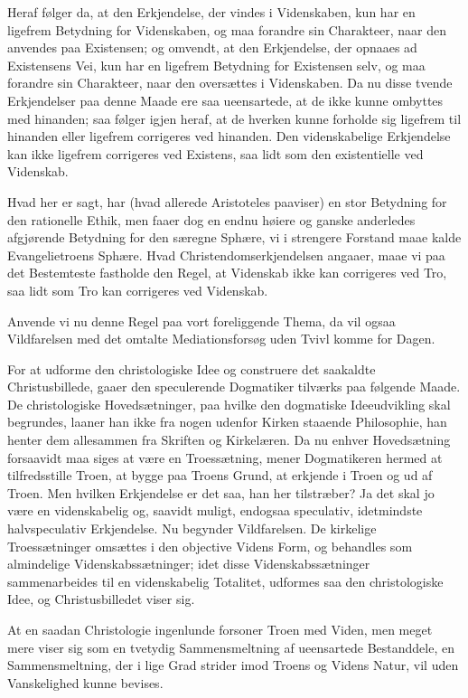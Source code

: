 \documentclass[12pt,a4paper]{book}
\newcommand{\opage}[1]{\marginnote{\footnotesize\textit{[#1]}}}
\begin{document}
Heraf følger da, at den Erkjendelse, der vindes i Videnskaben, kun har en
ligefrem Betydning for Videnskaben, og maa forandre sin Charakteer, naar
den anvendes paa Existensen; og omvendt, at den Erkjendelse, der opnaaes ad
Existensens Vei, kun har en ligefrem Betydning for Existensen selv, og maa
forandre sin Charakteer, naar den oversættes i Videnskaben. Da nu disse
tvende Erkjendelser paa denne Maade ere saa ueensartede, at de ikke kunne
ombyttes med hinanden; saa følger igjen
\opage{99} heraf, at de hverken kunne forholde sig ligefrem til hinanden eller
ligefrem corrigeres ved hinanden. Den videnskabelige Erkjendelse kan ikke
ligefrem corrigeres ved Existens, saa lidt som den existentielle ved
Videnskab.

Hvad her er sagt, har (hvad allerede Aristoteles paaviser) en stor
Betydning for den rationelle Ethik, men faaer dog en endnu høiere og ganske
anderledes afgjørende Betydning for den særegne Sphære, vi i strengere
Forstand maae kalde Evangelietroens Sphære. Hvad Christendomserkjendelsen
angaaer, maae vi paa det Bestemteste fastholde den Regel, at Videnskab ikke
kan corrigeres ved Tro, saa lidt som Tro kan corrigeres ved Videnskab.

Anvende vi nu denne Regel paa vort foreliggende Thema, da vil ogsaa
Vildfarelsen med det omtalte Mediationsforsøg uden Tvivl komme for Dagen.

For at udforme den christologiske Idee og construere det saakaldte
Christusbillede, gaaer den speculerende Dogmatiker tilværks paa følgende
Maade. De christologiske Hovedsætninger, paa hvilke den dogmatiske
Ideeudvikling skal begrundes, laaner han ikke fra nogen udenfor Kirken
staaende Philosophie, han henter dem allesammen fra Skriften og Kirkelæren.
Da nu enhver Hovedsætning forsaavidt maa siges at være en Troessætning,
mener Dogmatikeren hermed at tilfredsstille Troen, at bygge paa Troens
Grund, at erkjende i Troen og ud af Troen. Men hvilken Erkjendelse er det
saa, han her tilstræber? Ja det skal jo være en videnskabelig og, saavidt
muligt, endogsaa speculativ, idetmindste halvspeculativ Erkjendelse. Nu
begynder Vildfarelsen. De kirkelige Troessætninger omsættes i den objective
Videns Form, og behandles som almindelige Videnskabssætninger; idet disse
Videnskabssætninger sammenarbeides til en videnskabelig Totalitet,
udformes saa den christologiske Idee, og Christusbilledet viser sig.

At en saadan Christologie ingenlunde forsoner Troen med
\opage{100} Viden, men meget mere viser sig som en tvetydig Sammensmeltning af
ueensartede Bestanddele, en Sammensmeltning, der i lige Grad strider imod
Troens og Videns Natur, vil uden Vanskelighed kunne bevises.
\end{document}

